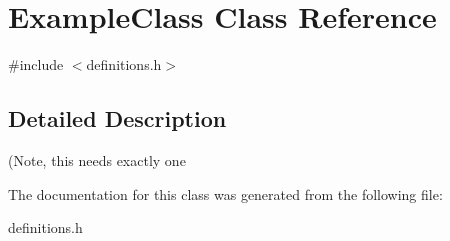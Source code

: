 \hypertarget{class_example_class}{}\section{Example\+Class Class Reference}
\label{class_example_class}


{\ttfamily \#include $<$definitions.\+h$>$}



\subsection{Detailed Description}
(Note, this needs exactly one 

The documentation for this class was generated from the following file\+:\begin{DoxyCompactItemize}
\item 
definitions.\+h\end{DoxyCompactItemize}
